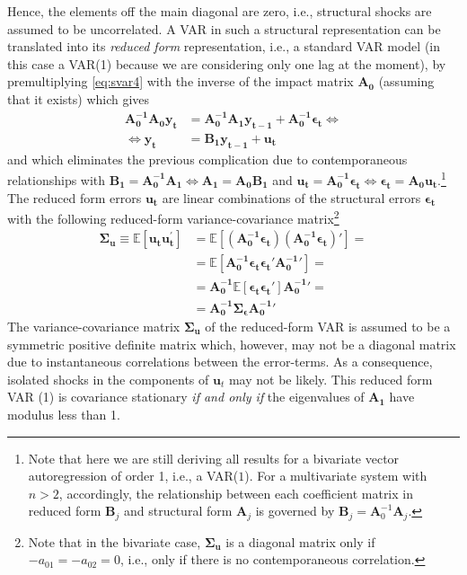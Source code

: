 \documentclass[a4paper,11pt,listof=nochaptergap,oneside,pointednumbers,bibtotoc,bigheadings,liststotoc,hidelinks]{scrbook}
\theoremstyle{mysatz}
\theoremstyle{mydefinition}
\theoremstyle{mytheorem}
\theoremstyle{mybemerkung}
\newcommand{\vect}[1]{\boldsymbol{\mathbf{#1}}}
\begin{document}
Hence, the elements off the main diagonal are zero, i.e., structural shocks are assumed to be uncorrelated. A VAR in such a structural representation can be translated into its \textit{reduced form} representation, i.e., a standard VAR model (in this case a VAR(1) because we are considering only one lag at the moment), by premultiplying \ref{eq:svar4} with the inverse of the impact matrix $\vect{A_0}$ (assuming that it exists) which gives
\begin{equation} \label{eq:svar5}
\begin{split}
	          \vect{A_0^{-1}}\vect{A_0}\vect{y_t} & = \vect{A_0^{-1}}\vect{A_1}\vect{y_{t-1}} + \vect{A_0^{-1}}\vect{\epsilon_t}     \iff \\
	\iff 						\vect{y_t} & = \vect{B_1}\vect{y_{t-1}} + \vect{u_t}
\end{split}								
\end{equation}
and which eliminates the previous complication due to contemporaneous relationships with $\vect{B_1} = \vect{A_0^{-1}}\vect{A_1} \iff \vect{A_1} = \vect{A_0}\vect{B_1}$ and $\vect{u_t} = \vect{A_0^{-1}}\vect{\epsilon_t} \iff \vect{\epsilon_t} = \vect{A_0}\vect{u_t}$.\footnote{Note that here we are still deriving all results for a bivariate vector autoregression of order 1, i.e., a VAR($1$). For a multivariate system with $n>2$, accordingly, the relationship between each coefficient matrix in reduced form $\vect{B}_j$ and structural form $\vect{A}_j$ is governed by $\vect{B}_j = \vect{A}_0^{-1}\vect{A}_j$.}\\
The reduced form errors $\vect{u_t}$ are linear combinations of the structural errors $\vect{\epsilon_t}$ with the following reduced-form variance-covariance matrix\footnote{Note that in the bivariate case, $\vect{\Sigma_u}$ is a diagonal matrix only if $-a_{01} = -a_{02} = 0$, i.e., only if there is no contemporaneous correlation.}
\begin{equation} \label{eq:svar6}
\begin{split}
 		\vect{\Sigma_u} \equiv \mathbb{E}[\vect{u_t}\vect{u_t^'}] & = \mathbb{E}[(\vect{A_0^{-1}}\vect{\epsilon_t}) (\vect{A_0^{-1}}\vect{\epsilon_t})' ] = \\
								& = \mathbb{E}[\vect{A_0^{-1}}\vect{\epsilon_t} \vect{\epsilon_t}'\vect{A_0^{-1}}'] = \\
								& = \vect{A_0^{-1}}\mathbb{E}[\vect{\epsilon_t} \vect{\epsilon_t}']\vect{A_0^{-1}}' = \\
								& = \vect{A_0^{-1}}\vect{\Sigma_\epsilon}\vect{A_0^{-1}}'
\end{split}								
\end{equation}
The variance-covariance matrix $\vect{\Sigma_u}$ of the reduced-form VAR is assumed to be a symmetric positive definite matrix which, however, may not be a diagonal matrix due to instantaneous correlations between the error-terms. As a consequence, isolated shocks in the components of $\vect{u}_t$ may not be likely. This reduced form VAR (1) is covariance stationary \textit{if and only if} the eigenvalues of $\vect{A_1}$ have modulus less than 1.\\
\end{document}
